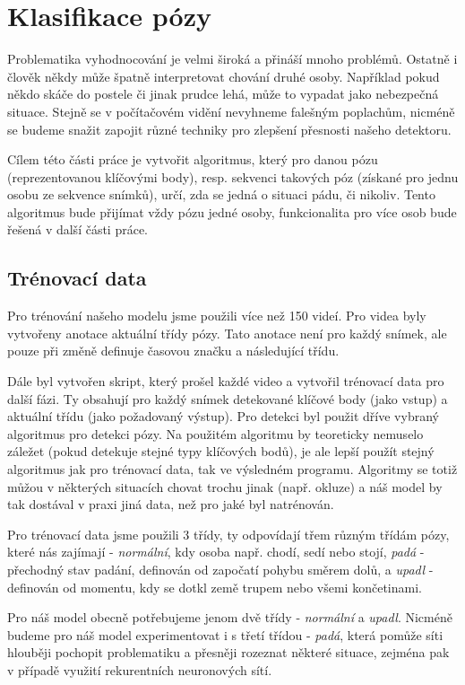 \chapter{Klasifikace pózy}
\label{sec:PoseClassification}

Problematika vyhodnocování je velmi široká a přináší mnoho problémů. Ostatně i
člověk někdy může špatně interpretovat chování druhé osoby. Například pokud
někdo skáče do postele či jinak prudce lehá, může to vypadat jako nebezpečná
situace. Stejně se v počítačovém vidění nevyhneme falešným poplachům, nicméně
se budeme snažit zapojit různé techniky pro zlepšení přesnosti našeho
detektoru.

Cílem této části práce je vytvořit algoritmus, který pro danou pózu
(reprezentovanou klíčovými body), resp. sekvenci takových póz (získané pro
jednu osobu ze sekvence snímků), určí, zda se jedná o situaci pádu, či nikoliv.
Tento algoritmus bude přijímat vždy pózu jedné osoby, funkcionalita pro více
osob bude řešená v další části práce.

\section{Trénovací data}

Pro trénování našeho modelu jsme použili více než 150 videí. Pro videa byly
vytvořeny anotace aktuální třídy pózy. Tato anotace není pro každý snímek, ale
pouze při změně definuje časovou značku a následující třídu.

Dále byl vytvořen skript, který prošel každé video a vytvořil trénovací data
pro další fázi. Ty obsahují pro každý snímek detekované klíčové body (jako
vstup) a aktuální třídu (jako požadovaný výstup). Pro detekci byl použit dříve
vybraný algoritmus pro detekci pózy. Na použitém algoritmu by teoreticky
nemuselo záležet (pokud detekuje stejné typy klíčových bodů), je ale lepší
použít stejný algoritmus jak pro trénovací data, tak ve výsledném programu.
Algoritmy se totiž můžou v některých situacích chovat trochu jinak (např.
okluze) a náš model by tak dostával v praxi jiná data, než pro jaké byl
natrénován.

Pro trénovací data jsme použili 3 třídy, ty odpovídají třem různým třídám pózy,
které nás zajímají - \textit{normální}, kdy osoba např. chodí, sedí nebo stojí,
\textit{padá} - přechodný stav padání, definován od započatí pohybu směrem
dolů, a \textit{upadl} - definován od momentu, kdy se dotkl země trupem nebo
všemi končetinami.

Pro náš model obecně potřebujeme jenom dvě třídy - \textit{normální} a
\textit{upadl}. Nicméně budeme pro náš model experimentovat i s třetí třídou -
\textit{padá}, která pomůže síti hlouběji pochopit problematiku a přesněji
rozeznat některé situace, zejména pak v případě využití rekurentních
neuronových sítí.

